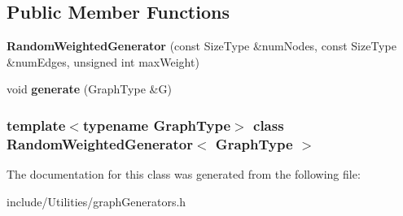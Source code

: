 \subsection*{Public Member Functions}
\begin{DoxyCompactItemize}
\item 
\hypertarget{class_random_weighted_generator_a7a30434d5a0ddf9e4efcae1e007d23eb}{
{\bfseries RandomWeightedGenerator} (const SizeType \&numNodes, const SizeType \&numEdges, unsigned int maxWeight)}
\label{class_random_weighted_generator_a7a30434d5a0ddf9e4efcae1e007d23eb}

\item 
\hypertarget{class_random_weighted_generator_afe52e4227860f78f6205b0c527c658b9}{
void {\bfseries generate} (GraphType \&G)}
\label{class_random_weighted_generator_afe52e4227860f78f6205b0c527c658b9}

\end{DoxyCompactItemize}
\subsubsection*{template$<$typename GraphType$>$ class RandomWeightedGenerator$<$ GraphType $>$}



The documentation for this class was generated from the following file:\begin{DoxyCompactItemize}
\item 
include/Utilities/graphGenerators.h\end{DoxyCompactItemize}
